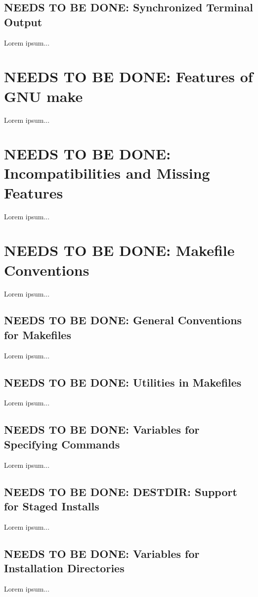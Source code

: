 \documentclass{charun}
\begin{document}
\begin{multicols*}{2}
\color{gray}
\subsection{NEEDS TO BE DONE: Synchronized Terminal Output}
Lorem ipsum...
\color{black}


\color{gray}
\section{NEEDS TO BE DONE: Features of GNU make}
Lorem ipsum...
\color{black}

\color{gray}
\section{NEEDS TO BE DONE: Incompatibilities and Missing Features}
Lorem ipsum...
\color{black}

\color{gray}
\section{NEEDS TO BE DONE: Makefile Conventions}
Lorem ipsum...
\color{black}


\color{gray}
\subsection{NEEDS TO BE DONE: General Conventions for Makefiles}
Lorem ipsum...
\color{black}

\color{gray}
\subsection{NEEDS TO BE DONE: Utilities in Makefiles}
Lorem ipsum...
\color{black}

\color{gray}
\subsection{NEEDS TO BE DONE: Variables for Specifying Commands}
Lorem ipsum...
\color{black}

\color{gray}
\subsection{NEEDS TO BE DONE: DESTDIR: Support for Staged Installs}
Lorem ipsum...
\color{black}

\color{gray}
\subsection{NEEDS TO BE DONE: Variables for Installation Directories}
Lorem ipsum...
\color{black}


\end{multicols*}
\end{document}
